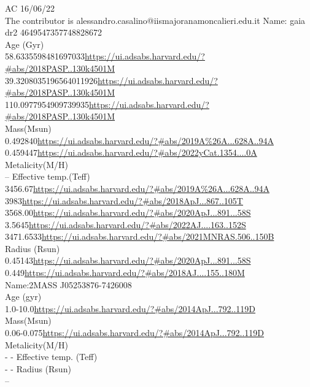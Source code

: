 AC 16/06/22\\ The contributor is alessandro.casalino@iismajoranamoncalieri.edu.it
Name: gaia dr2 4649547357748828672  \\
Age (Gyr)\\
58.6335598481697033\url{https://ui.adsabs.harvard.edu/?#abs/2018PASP..130k4501M}\\
39.3208035196564011926\url{https://ui.adsabs.harvard.edu/?#abs/2018PASP..130k4501M}\\
110.0977954909739935\url{https://ui.adsabs.harvard.edu/?#abs/2018PASP..130k4501M}\\

Mass(Msun)\\
0.492840\url{https://ui.adsabs.harvard.edu/?#abs/2019A%26A...628A..94A}\\
0.459447\url{https://ui.adsabs.harvard.edu/?#abs/2022yCat.1354....0A}\\
Metalicity(M/H)\\
--
Effective temp.(Teff)\\
3456.67\url{https://ui.adsabs.harvard.edu/?#abs/2019A%26A...628A..94A}\\
3983\url{https://ui.adsabs.harvard.edu/?#abs/2018ApJ...867..105T}\\
3568.00\url{https://ui.adsabs.harvard.edu/?#abs/2020ApJ...891...58S}\\
3.5645\url{https://ui.adsabs.harvard.edu/?#abs/2022AJ....163..152S}\\
3471.6533\url{https://ui.adsabs.harvard.edu/?#abs/2021MNRAS.506..150B}\\
Radius (Rsun)\\
0.45143\url{https://ui.adsabs.harvard.edu/?#abs/2020ApJ...891...58S}\\
0.449\url{https://ui.adsabs.harvard.edu/?#abs/2018AJ....155..180M}\\

Name:2MASS J05253876-7426008\\
Age (gyr)\\
1.0-10.0\url{https://ui.adsabs.harvard.edu/?#abs/2014ApJ...792..119D}\\
Mass(Msun)\\
0.06-0.075\url{https://ui.adsabs.harvard.edu/?#abs/2014ApJ...792..119D}\\
Metalicity(M/H)\\
- -
Effective temp. (Teff)\\
- -
Radius (Rsun)\\
--